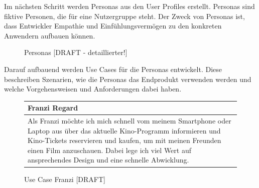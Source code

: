 		Im nächsten Schritt werden Personas aus den User Profiles erstellt. Personas sind fiktive Personen, die für eine Nutzergruppe steht. Der Zweck von Personas ist, dass Entwickler Empathie und Einfühlungsvermögen zu den konkreten Anwendern aufbauen können. 
		
		\begin{figure}[H]
			\caption[Personas ]{\label{fig:personas}Personas [DRAFT - detaillierter!] }
		\end{figure} 
		
		Darauf aufbauend werden Use Cases für die Personas entwickelt. Diese beschreiben Szenarien, wie die Personas das Endprodukt verwenden werden und welche Vorgehensweisen und Anforderungen dabei haben. 
		
		\begin{figure}[H]
			\begin{tabular}{p{13cm}}
				\textbf{Franzi Regard} \\\toprule
				Als Franzi möchte ich mich schnell vom meinem Smartphone oder Laptop aus über das aktuelle Kino-Programm informieren und Kino-Tickets reservieren und kaufen, um mit meinen Freunden einen Film anzuschauen. Dabei lege ich viel Wert auf ansprechendes Design und eine schnelle Abwicklung.
			\end{tabular}
			\caption[Use Case Franzi]{\label{fig:useCaseFranzi} Use Case Franzi [DRAFT]}
		\end{figure}
	
